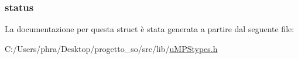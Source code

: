 \hypertarget{structstate__t_ae37efb991e613c0dc476ece5ed4ffa71}{
\subsubsection[{status}]{ status}}\label{structstate__t_ae37efb991e613c0dc476ece5ed4ffa71}


La documentazione per questa struct è stata generata a partire dal seguente file\-:\begin{DoxyCompactItemize}
\item 
C\-:/\-Users/phra/\-Desktop/progetto\-\_\-so/src/lib/\hyperlink{u_m_p_stypes_8h}{u\-M\-P\-Stypes.\-h}\end{DoxyCompactItemize}
